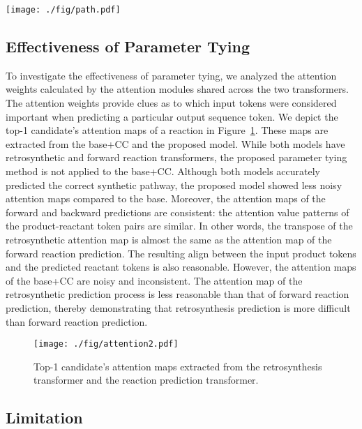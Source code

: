 \documentclass[journal=jacsat,manuscript=article]{achemso}
\begin{document}
\begin{figure*}
	\centering
	\texttt{[image: ./fig/path.pdf]}
	\caption{Example of retrosynthetic predictions before and after cycle consistency check for obtaining plausible candidates.}
	\label{fig:analysis}
\end{figure*}


	
\subsection{Effectiveness of Parameter Tying}
	

To investigate the effectiveness of parameter tying, we analyzed the attention weights calculated by the attention modules shared across the two transformers. The attention weights provide clues as to which input tokens were considered important when predicting a particular output sequence token. We depict the top-1 candidate’s attention maps of a reaction in Figure~\ref{fig:attention}. These maps are extracted from the base+CC and the proposed model. While both models have retrosynthetic and forward reaction transformers, the proposed parameter tying method is not applied to the base+CC. Although both models accurately predicted the correct synthetic pathway, the proposed model showed less noisy attention maps compared to the base. Moreover, the attention maps of the forward and backward predictions are consistent: the attention value patterns of the product-reactant token pairs are similar. In other words, the transpose of the retrosynthetic attention map is almost the same as the attention map of the forward reaction prediction. The resulting align between the input product tokens and the predicted reactant tokens is also reasonable. However, the attention maps of the base+CC are noisy and inconsistent. The attention map of the retrosynthetic prediction process is less reasonable than that of forward reaction prediction, thereby demonstrating that retrosynthesis prediction is more difficult than forward reaction prediction.

\begin{figure}
	\centering
	\texttt{[image: ./fig/attention2.pdf]}
	\caption{Top-1 candidate's attention maps extracted from the retrosynthesis transformer and the reaction prediction transformer.}
	\label{fig:attention}
\end{figure}


	\subsection{Limitation}
\end{document}
